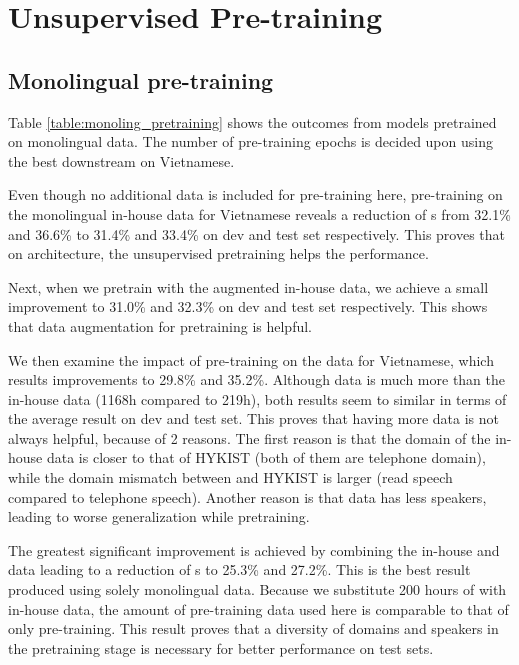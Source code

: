 \section{Unsupervised Pre-training}
\label{sec: unsupervised_pretraining}

%

\subsection{Monolingual pre-training}

Table \ref{table:monoling_pretraining} shows the outcomes from models pretrained on monolingual data.
The number of pre-training epochs is decided upon using the best downstream  on Vietnamese.



Even though no additional data is included for pre-training here, pre-training on the monolingual in-house data for Vietnamese reveals a reduction of s from 32.1\% and 36.6\% to 31.4\% and 33.4\% on dev and test set respectively.
This proves that on  architecture, the unsupervised pretraining helps the  performance.

Next, when we pretrain with the augmented in-house data, we achieve a small improvement to 31.0\% and 32.3\% on dev and test set respectively.
This shows that data augmentation for pretraining is helpful.

We then examine the impact of pre-training on the  data for Vietnamese, which results improvements to 29.8\% and 35.2\%.
Although  data is much more than the in-house data (1168h compared to 219h), both results seem to similar in terms of the average result on dev and test set. 
This proves that having more data is not always helpful, because of 2 reasons.
The first reason is that the domain of the in-house data is closer to that of HYKIST (both of them are telephone domain), while the domain mismatch between  and HYKIST is larger (read speech compared to telephone speech).
Another reason is that  data has less speakers, leading to worse generalization while pretraining.

The greatest significant improvement is achieved by combining the in-house and  data leading to a reduction of s to 25.3\% and 27.2\%.
This is the best result produced using solely monolingual data. 
Because we substitute 200 hours of  with in-house data, the amount of pre-training data used here is comparable to that of only  pre-training. 
This result proves that a diversity of domains and speakers in the pretraining stage is necessary for better performance on test sets.


